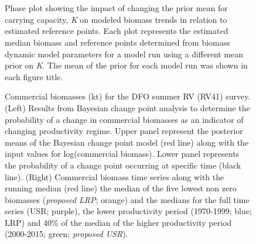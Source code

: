 \documentclass[11pt]{article}
\newcommand{\e}{/backup/bio_data/bio.lobster/figures/} %
\newcommand{\spm}{/backup/bio_data/bio.lobster/spmodelling/lfa41/}
\begin{document}
\begin{landscape}
\begin{figure}
\centering
 \\
 \\



\caption{Phase plot showing the impact of changing the prior mean for carrying capacity, \emph{K} on modeled biomass trends in relation to estimated reference points. Each plot represents the estimated median biomass and reference points determined from biomass dynamic model parameters for a model run using a different mean prior on \emph{K}. The mean of the prior for each model run was shown in each figure title.}

\end{figure}
\end{landscape}
     \clearpage



\begin{landscape}
\begin{figure}
\centering
       \caption{Commercial biomasses (kt) for the DFO summer RV (RV41) survey. (Left) Results from Bayesian change point analysis to determine the probability of a change in commercial biomasses as an indicator of changing productivity regime. Upper panel represent the posterior means of the Bayesian change point model (red line) along with the input values for log(commercial biomass). Lower panel represents the probability of a change point occurring at specific time (black line). (Right) Commercial biomass time series along with the running median (red line) the median of the five lowest non zero biomasses (\emph{proposed LRP}; orange) and the medians for the full time series (USR; purple), the lower productivity period (1970-1999; blue; LRP) and 40\% of the median of the higher productivity period (2000-2015; green; \emph{proposed USR}). }

\end{figure}
\end{landscape}
\end{document}

